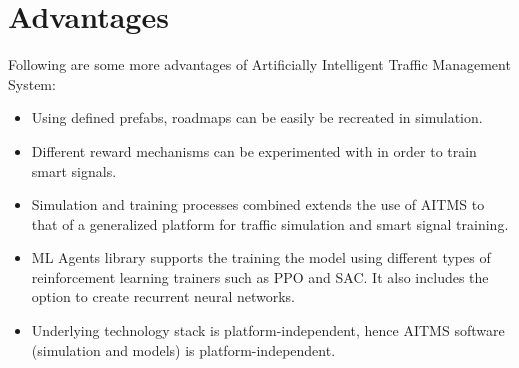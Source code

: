 \documentclass[openany,12pt]{report}
\begin{document}
	
		\section{Advantages}
		Following are some more advantages of Artificially Intelligent Traffic Management System:
		\begin{itemize}
			\item{Using defined prefabs, roadmaps can be easily be recreated in simulation.}
			\item{Different reward mechanisms can be experimented with in order to train smart signals.}
			\item{Simulation and training processes combined extends the use of AITMS to that of a generalized platform for traffic simulation and smart signal training.}
			\item{ML Agents library supports the training the model using different types of reinforcement learning trainers such as PPO and SAC. It also includes the option to create recurrent neural networks. }
			\item{Underlying technology stack is platform-independent, hence AITMS software (simulation and models) is platform-independent.}	
		\end{itemize}
		

		\newpage
\end{document}
